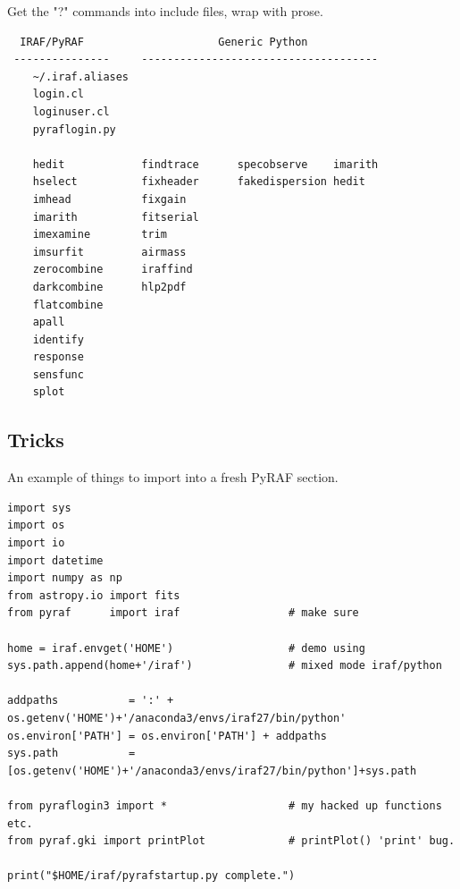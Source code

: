 \documentclass[letter,11pt,oneside]{article}
\newcommand{\ltodo}[2]{\marginpar{\textcolor{red}{ACTION: #1}\endnote{#2}}}
\begin{document}
Get the "?" commands into include files, wrap with prose.
\begingroup \fontsize{10pt}{10pt}
\selectfont
\begin{verbatim} 
  IRAF/PyRAF                     Generic Python
 ---------------     -------------------------------------
    ~/.iraf.aliases
    login.cl
    loginuser.cl
    pyraflogin.py

    hedit            findtrace      specobserve    imarith
    hselect          fixheader      fakedispersion hedit  
    imhead           fixgain                              
    imarith          fitserial                        
    imexamine        trim                                 
    imsurfit         airmass                              
    zerocombine      iraffind                             
    darkcombine      hlp2pdf                              
    flatcombine
    apall
    identify
    response
    sensfunc
    splot

\end{verbatim}
\endgroup

\subsection{Tricks}

\ltodo{bash tricks}{add the bash tricks}

An example of things to import into a fresh PyRAF section.

\begingroup \fontsize{10pt}{10pt}
\selectfont
\begin{verbatim} 
import sys
import os
import io
import datetime
import numpy as np
from astropy.io import fits
from pyraf      import iraf                 # make sure

home = iraf.envget('HOME')                  # demo using 
sys.path.append(home+'/iraf')               # mixed mode iraf/python

addpaths           = ':' + os.getenv('HOME')+'/anaconda3/envs/iraf27/bin/python' 
os.environ['PATH'] = os.environ['PATH'] + addpaths
sys.path           = [os.getenv('HOME')+'/anaconda3/envs/iraf27/bin/python']+sys.path

from pyraflogin3 import *                   # my hacked up functions etc.
from pyraf.gki import printPlot             # printPlot() 'print' bug.

print("$HOME/iraf/pyrafstartup.py complete.")

\end{verbatim}
\endgroup
\end{document}
